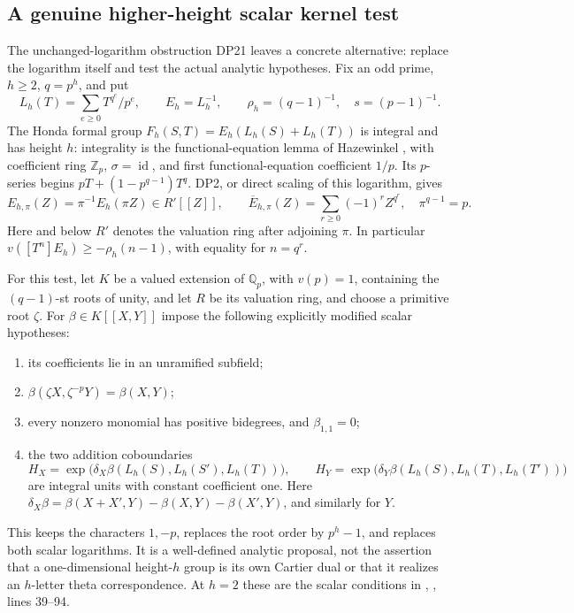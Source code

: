 \documentclass[11pt,a4paper]{article}
\theoremstyle{definition}\newtheorem{remark}[theorem]{Remark}
\newcommand{\Z}{\mathbb Z}\newcommand{\Q}{\mathbb Q}\newcommand{\F}{\mathbb F}
\newcommand{\id}{\operatorname{id}}\newcommand{\Hom}{\operatorname{Hom}}
\begin{document}
\subsection{A genuine higher-height scalar kernel test}\label{sec:kerneltest}

The unchanged-logarithm obstruction DP21 leaves a concrete alternative: replace the logarithm itself and test the actual analytic hypotheses. Fix an odd prime, $h\ge2$, $q=p^h$, and put
\[
 L_h(T)=\sum_{e\ge0}T^{q^e}/p^e,\qquad E_h=L_h^{-1},\qquad
 \rho_h=(q-1)^{-1},\quad s=(p-1)^{-1}.
\]
The Honda formal group $F_h(S,T)=E_h(L_h(S)+L_h(T))$ is integral and has height $h$: integrality is the functional-equation lemma of Hazewinkel \cite[Lemma 2.3 and (2.5), p.~74]{Hazewinkel}, with coefficient ring $\Z_p$, $\sigma=\id$, and first functional-equation coefficient $1/p$. Its $p$-series begins $pT+(1-p^{q-1})T^q$. DP2, or direct scaling of this logarithm, gives
\begin{equation}\label{eq:honda-scale}
 E_{h,\pi}(Z)=\pi^{-1}E_h(\pi Z)\in R'[[Z]],\qquad
 \overline E_{h,\pi}(Z)=\sum_{r\ge0}(-1)^rZ^{q^r},\quad \pi^{q-1}=p.
\end{equation}
Here and below $R'$ denotes the valuation ring after adjoining $\pi$. In particular $v([T^n]E_h)\ge-\rho_h(n-1)$, with equality for $n=q^r$.

For this test, let $K$ be a valued extension of $\Q_p$, with $v(p)=1$, containing the $(q-1)$-st roots of unity, and let $R$ be its valuation ring, and choose a primitive root $\zeta$. For $\beta\in K[[X,Y]]$ impose the following explicitly modified scalar hypotheses:
\begin{enumerate}[label=(H\arabic*),leftmargin=2.8em]
\item its coefficients lie in an unramified subfield;
\item $\beta(\zeta X,\zeta^{-p}Y)=\beta(X,Y)$;
\item every nonzero monomial has positive bidegrees, and $\beta_{1,1}=0$;
\item the two addition coboundaries
\[
 H_X=\exp\bigl(\delta_X\beta(L_h(S),L_h(S'),L_h(T))\bigr),\qquad
 H_Y=\exp\bigl(\delta_Y\beta(L_h(S),L_h(T),L_h(T'))\bigr)
\]
are integral units with constant coefficient one. Here $\delta_X\beta=\beta(X+X',Y)-\beta(X,Y)-\beta(X',Y)$, and similarly for $Y$.
\end{enumerate}
This keeps the characters $1,-p$, replaces the root order by $p^h-1$, and replaces both scalar logarithms. It is a well-defined analytic proposal, not the assertion that a one-dimensional height-$h$ group is its own Cartier dual or that it realizes an $h$-letter theta correspondence. At $h=2$ these are the scalar conditions in , , lines 39--94.
\end{document}
